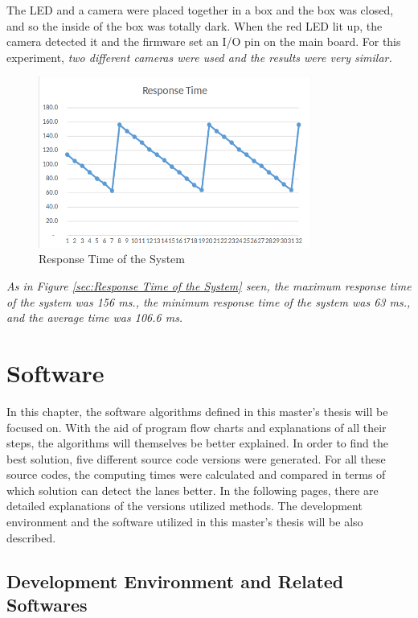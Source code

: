 The LED and a camera were placed together in a box and the box was closed, and so the inside of the box was totally dark. When the red LED lit up, the camera detected it and the firmware set an I/O pin on the main board. For this experiment,  \emph{\color{green}two different cameras were used and the results were very similar.}


\begin{figure}[H]
 \centering
  \includegraphics[width=0.8\textwidth]{./Bilder/Response_Time2.png}		 \caption{Response Time of the System}
  \label{fig:Response_Time_of_the_System}
\end{figure}


\emph{\color{green}As in Figure \ref{sec:Response Time of the System} seen, the maximum response time of the system was 156 ms., the minimum
response time of the system was 63 ms., and the average time was 106.6 ms.}




%
\section{Software}\label{sec:Software}


In this chapter, the software algorithms defined in this master's thesis will be focused on. With the aid of program flow charts and explanations of all their steps, the algorithms will themselves be better explained. In order to find the best solution, five different source code versions were generated. For all these source codes, the computing times were calculated and compared in terms of which solution can detect the lanes better. In the following pages, there are detailed explanations of the versions utilized methods. The development environment and the software utilized in this master's thesis will be also described.

%
\subsection{Development Environment and Related Softwares}
\label{sec:Development Environment and Related Softwares}


